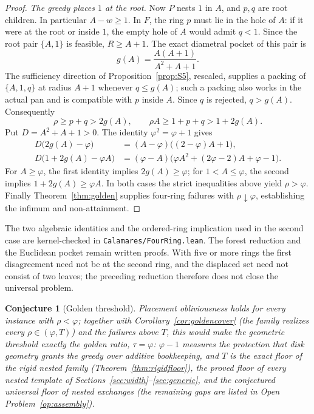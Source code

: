\documentclass[11pt]{article}
\newtheorem{conjecture}[theorem]{Conjecture}
\theoremstyle{definition}
\begin{document}
\begin{proof}
\emph{The greedy places $1$ at the root.} Now $P$ nests $1$ in
$A$, and $p,q$ are root children. In particular $A-w\ge1$.
In $F$, the ring $p$ must lie in the hole of $A$: if it were at the
root or inside $1$, the empty hole of $A$ would admit $q<1$.
Since the root pair $\{A,1\}$ is feasible, $R\ge A+1$. The exact
diametral pocket of this pair is
\[
 g(A)=\frac{A(A+1)}{A^2+A+1}.
\]
The sufficiency direction of Proposition~\ref{prop:S5}, rescaled,
supplies a packing of
$\{A,1,q\}$ at radius $A+1$ whenever $q\le g(A)$; such a packing
also works in the actual pan and is compatible with $p$ inside $A$.
Since $q$ is rejected, $q>g(A)$. Consequently
\[
 \rho\ge p+q>2g(A),\qquad
 \rho A\ge1+p+q>1+2g(A).
\]
Put $D=A^2+A+1>0$. The identity $\varphi^2=\varphi+1$ gives
\begin{align*}
 D\bigl(2g(A)-\varphi\bigr)
  &=(A-\varphi)\bigl((2-\varphi)A+1\bigr),\\
 D\bigl(1+2g(A)-\varphi A\bigr)
  &=(\varphi-A)\bigl(\varphi A^2+(2\varphi-2)A+\varphi-1\bigr).
\end{align*}
For $A\ge\varphi$, the first identity implies $2g(A)\ge\varphi$;
for $1<A\le\varphi$, the second implies $1+2g(A)\ge\varphi A$.
In both cases the strict inequalities above yield $\rho>\varphi$.
Finally Theorem~\ref{thm:golden} supplies four-ring failures with
$\rho\downarrow\varphi$, establishing the infimum and non-attainment.
\end{proof}

The two algebraic identities and the ordered-ring implication used in
the second case are kernel-checked in \texttt{Calamares/FourRing.lean}.
The forest reduction and the Euclidean pocket remain written proofs.
With five or more rings the first disagreement need not be at the
second ring, and the displaced set need not consist of two leaves;
the preceding reduction therefore does not close the universal problem.

\begin{conjecture}[Golden threshold]\label{conj:golden}
Placement obliviousness holds for every instance with $\rho<\varphi$;
together with Corollary~\ref{cor:goldencover} (the family realizes
every $\rho\in(\varphi,T)$) and the failures above $T$, this would make the
geometric threshold exactly the golden ratio, $\tau=\varphi$:
$\varphi-1$ measures the
protection that disk geometry grants the greedy over additive
bookkeeping, and $T$ is the exact floor of the rigid nested family
(Theorem~\ref{thm:rigidfloor}), the proved floor of every nested
template of Sections~\ref{sec:width}--\ref{sec:generic}, and the
conjectured universal floor of nested exchanges (the remaining
gaps are listed in Open Problem~\ref{op:assembly}).
\end{conjecture}
\end{document}
